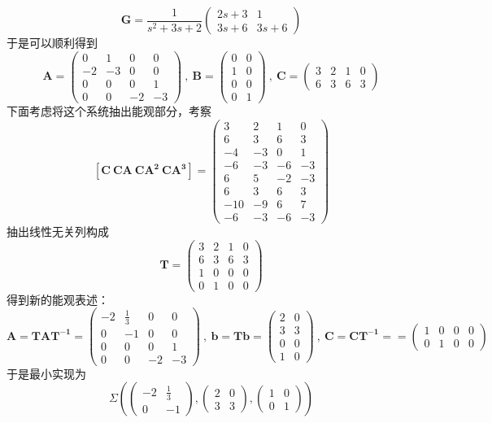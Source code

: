 \documentclass[UTF8,a4paper]{ctexart}
\begin{document}
\section{}
$$\mathbf{G}=\frac{1}{s^2+3s+2}\begin{pmatrix}
2s+3&1\\
3s+6&3s+6\end{pmatrix}$$
于是可以顺利得到$$\mathbf{A}=\begin{pmatrix}
0&1&0&0\\
-2&-3&0&0\\
0&0&0&1\\
0&0&-2&-3\end{pmatrix}\ ,\ \mathbf{B}=\begin{pmatrix}0&0\\1&0\\0&0\\0&1\end{pmatrix}\ ,\ \mathbf{C}=\begin{pmatrix}
3&2&1&0\\
6&3&6&3\end{pmatrix}$$
下面考虑将这个系统抽出能观部分，考察
$$\mathbf{[C \ CA \ CA^2\  CA^3]}=\begin{pmatrix}
3&2&1&0\\
6&3&6&3\\
-4&-3&0&1\\
-6&-3&-6&-3\\
6&5&-2&-3\\
6&3&6&3\\
-10&-9&6&7\\
-6&-3&-6&-3
\end{pmatrix}$$
抽出线性无关列构成$$\mathbf{T}=\begin{pmatrix}
3&2&1&0\\
6&3&6&3\\
1&0&0&0\\
0&1&0&0\end{pmatrix}$$
得到新的能观表述：
$$\mathbf{A=TAT^{-1}}=\begin{pmatrix}
-2&\frac{1}{3}&0&0\\
0&-1&0&0\\
0&0&0&1\\
0&0&-2&-3\end{pmatrix}\ , \ \mathbf{b={Tb}}=\begin{pmatrix}
2&0\\
3&3\\
0&0\\
1&0\end{pmatrix}\ , \ \mathbf{C={CT^{-1}}}==\begin{pmatrix}
1&0&0&0\\
0&1&0&0\end{pmatrix}$$
于是最小实现为
$$\Sigma(\begin{pmatrix}
-2&\frac{1}{3}\\
0&-1\end{pmatrix},
\begin{pmatrix}2&0\\3&3\end{pmatrix},
\begin{pmatrix}1&0\\0&1\end{pmatrix})$$
\end{document}
